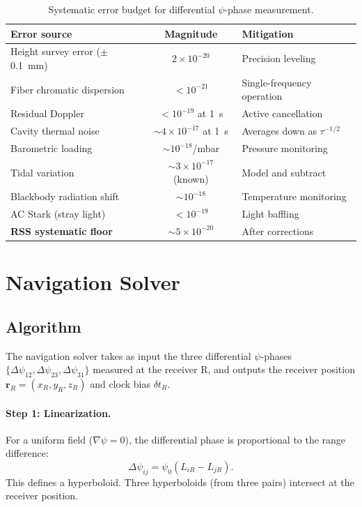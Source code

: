 \documentclass[12pt,letterpaper]{article}
\begin{document}
\begin{table}[h]
\centering
\caption{Systematic error budget for differential $\psi$-phase measurement.}
\label{tab:systematics}
\begin{tabular}{@{}lcl@{}}
\toprule
Error source & Magnitude & Mitigation \\
\midrule
Height survey error ($\pm$0.1~mm) & $2\times10^{-20}$ & Precision leveling \\
Fiber chromatic dispersion & $< 10^{-21}$ & Single-frequency operation \\
Residual Doppler & $< 10^{-19}$ at 1~s & Active cancellation \\
Cavity thermal noise & $\sim 4\times10^{-17}$ at 1~s & Averages down as $\tau^{-1/2}$ \\
Barometric loading & $\sim 10^{-18}$/mbar & Pressure monitoring \\
Tidal variation & $\sim 3\times10^{-17}$ (known) & Model and subtract \\
Blackbody radiation shift & $\sim 10^{-18}$ & Temperature monitoring \\
AC Stark (stray light) & $< 10^{-19}$ & Light baffling \\
\midrule
\textbf{RSS systematic floor} & $\sim 5\times10^{-20}$ & After corrections \\
\bottomrule
\end{tabular}
\end{table}

\section{Navigation Solver}

\subsection{Algorithm}

The navigation solver takes as input the three differential $\psi$-phases
$\{\Delta\psi_{12}, \Delta\psi_{23}, \Delta\psi_{31}\}$ measured at the
receiver R, and outputs the receiver position $\mathbf{r}_R = (x_R, y_R, z_R)$
and clock bias $\delta t_R$.

\paragraph{Step 1: Linearization.}
For a uniform field ($\nabla\psi = 0$), the differential phase is
proportional to the range difference:
\begin{equation}
\Delta\psi_{ij} = \psi_0 (L_{iR} - L_{jR}).
\end{equation}
This defines a hyperboloid. Three hyperboloids (from three pairs) intersect
at the receiver position.
\end{document}
